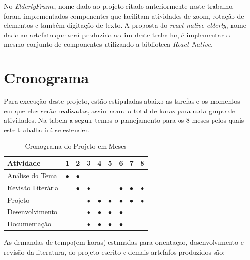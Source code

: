\documentclass[
	12pt,				    %
	openright,			    %
	oneside,			    %
	a4paper,			    %
    sumario=tradicional,    %
	english,			    %
	brazil,				    %
	]{abntex2}              %
\begin{document}
\par
		
No \textit{ElderlyFrame}, nome dado ao projeto citado anteriormente neste trabalho, foram implementados componentes que facilitam atividades de zoom, rotação de elementos e também digitação de texto. A proposta do \emph{react-native-elderly}, nome dado ao artefato que será produzido ao fim deste trabalho, é implementar o mesmo conjunto de componentes utilizando a biblioteca \textit{React Native}.		 

\chapter{Cronograma}\label{sec:cronograma}

Para execução deste projeto, estão estipuladas abaixo as tarefas e os momentos em que elas serão realizadas, assim como o total de horas para cada grupo de atividades. Na tabela a seguir temos o planejamento para os 8 meses pelos quais este trabalho irá se estender:

\par

\begin{table}[htbp]
  \centering
    \caption[Cronograma mensal]{Cronograma do Projeto em Meses}
    \label{tab:cronogramaMensal}
    \begin{tabular}{lcccccccc} %
    \toprule
    \textbf{Atividade} & \textbf{1} & \textbf{2} & \textbf{3} & \textbf{4} & \textbf{5} & \textbf{6} & \textbf{7} & \textbf{8} \\
    \midrule
        Análise do Tema & $\bullet$ & $\bullet$ & & & & & &\\
        Revisão Literária & & $\bullet$ & $\bullet$ & & & $\bullet$ & $\bullet$ & $\bullet$ \\
        Projeto & & & $\bullet$ & $\bullet$ & $\bullet$ & $\bullet$ & $\bullet$ & $\bullet$ \\
        Desenvolvimento & & & $\bullet$ & $\bullet$ & $\bullet$ & $\bullet$ & & \\
        Documentação & & & $\bullet$ & $\bullet$ & $\bullet$ & $\bullet$ & & \\
    \bottomrule
    \end{tabular}
\end{table}

As demandas de tempo(em horas) estimadas para orientação, desenvolvimento e revisão da literatura, do projeto escrito e demais artefafos produzidos são:
\end{document}
